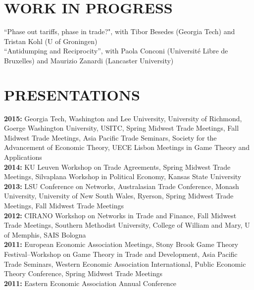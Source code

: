 \documentclass[11pt]{res}
\begin{document}
\begin{resume}
\section{WORK IN PROGRESS}\vspace{1.5mm}
``Phase out tariffs, phase in trade?", with Tibor Besedes (Georgia Tech) and Tristan Kohl (U of Groningen) \vspace{1.5mm}\\
``Antidumping and Reciprocity'', with Paola Conconi (Université Libre de Bruxelles) and Maurizio Zanardi (Lancaster University)\\

\section{PRESENTATIONS}\vspace{1.5mm}
{\bf 2015:} Georgia Tech, Washington and Lee University, University of Richmond, Goerge Washington University, USITC, Spring Midwest Trade Meetings, Fall Midwest Trade Meetings, Asia Pacific Trade Seminars, Society for the Advancement of Economic Theory, UECE Lisbon Meetings in Game Theory and Applications\vspace{1.5mm}\\
{\bf 2014:} KU Leuven Workshop on Trade Agreements, Spring Midwest Trade Meetings, Silvaplana Workshop in Political Economy, Kansas State University\vspace{1.5mm}\\
{\bf 2013:} LSU Conference on Networks, Australasian Trade Conference, Monash University, University of New South Wales, Ryerson, Spring Midwest Trade Meetings, Fall Midwest Trade Meetings\vspace{1.5mm}\\
{\bf 2012:}  CIRANO Workshop on Networks in Trade and Finance, Fall Midwest Trade Meetings, Southern Methodist University, College of William and Mary, U of Memphis, SAIS Bologna\vspace{1.5mm}\\
{\bf 2011:} European Economic Association Meetings, Stony Brook Game Theory Festival--Workshop on Game Theory in Trade and Development, Asia Pacific Trade Seminars, Western Economic Association International, Public Economic Theory Conference, Spring Midwest Trade Meetings\vspace{1.5mm}\\
{\bf 2011:} Eastern Economic Association Annual Conference \vspace{1.5mm}\\


\end{resume}
\end{document}

